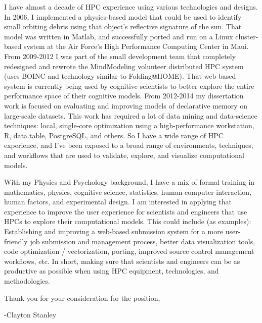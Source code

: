 \documentclass{article}
\begin{document}
I have almost a decade of HPC experience using various technologies and designs.
In 2006, I implemented a physics-based model that could be used to identify small orbiting debris using that object's reflective signature of the sun.
That model was written in Matlab, and successfully ported and run on a Linux cluster-based system at the Air Force's High Performance Computing Center in Maui.
From 2009-2012 I was part of the small development team that completely redesigned and rewrote the MindModeling volunteer distributed HPC system (uses BOINC and technology similar to Folding@HOME).
That web-based system is currently being used by cognitive scientists to better explore the entire performance space of their cognitive models.
From 2012-2014 my dissertation work is focused on evaluating and improving models of declarative memory on large-scale datasets.
This work has required a lot of data mining and data-science techniques: local, single-core optimization using a high-performance workstation, R, data.table, PostgreSQL, and others.
So I have a wide range of HPC experience, and I've been exposed to a broad range of environments, techniques, and workflows that are used to validate, explore, and visualize computational models.

With my Physics and Psychology background, I have a mix of formal training in mathematics, physics, cognitive science, statistics, human-computer interaction, human factors, and experimental design.
I am interested in applying that experience to improve the user experience for scientists and engineers that use HPCs to explore their computational models.
This could include (as examples): Establishing and improving a web-based submission system for a more user-friendly job submission and management process,
better data visualization tools, code optimization / vectorization, porting, improved source control management workflows, etc.
In short, making sure that scientists and engineers can be as productive as possible when using HPC equipment, technologies, and methodologies.

Thank you for your consideration for the position,

-Clayton Stanley
\end{document}
